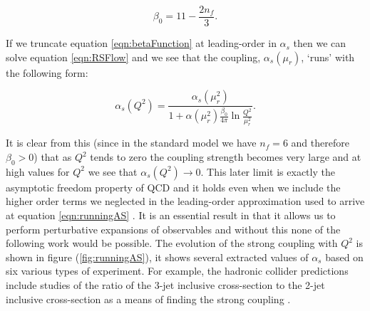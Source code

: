 	\begin{equation}
		\beta_0 = 11 - \frac{2n_f}{3}.
	\end{equation}

	If we truncate equation \eqref{eqn:betaFunction} at leading-order in $\alpha_s$ then we can solve equation \eqref{eqn:RSFlow}
	and we see that the coupling, $\alpha_s(\mu_r)$, `runs' with the following form:

	\begin{equation}
		\alpha_s(Q^2) = \frac{\alpha_s(\mu_r^2)}{1 + \alpha(\mu_r^2)\frac{\beta_0}{4\pi}\ln\frac{Q^2}{\mu_r^2}}.
		\label{eqn:runningAS}
	\end{equation}

	It is clear from this (since in the standard model we have $n_f=6$ and therefore $\beta_0>0$) that as $Q^2$ tends to
	zero the coupling strength becomes very large and at high values for $Q^2$ we see that $\alpha_s(Q^2)\rightarrow0$.
	This later limit is exactly the asymptotic freedom property of QCD and it holds even when we include the higher order
	terms we neglected in the leading-order approximation used to arrive at equation \eqref{eqn:runningAS} \cite{Beringer:1900zz}.
	It is an essential result in that it allows us to perform perturbative expansions of observables and without this none of the
	following work would be possible.  The evolution of the strong coupling with $Q^2$ is shown in figure (\ref{fig:runningAS}),
	it shows several extracted values of $\alpha_s$ based on six various types of experiment.  For example, the hadronic
	collider predictions include studies of the ratio of the 3-jet inclusive cross-section to the 2-jet inclusive
	cross-section as a means of finding the strong coupling \cite{Chatrchyan:2013txa}.

